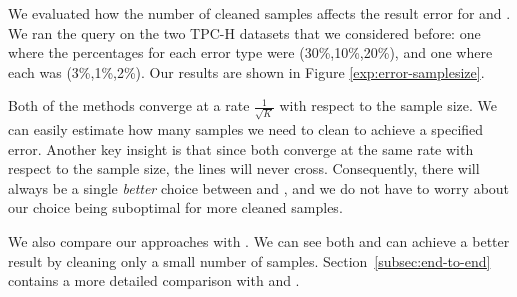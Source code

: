 We evaluated how the number of cleaned samples affects the result error for \sampleclean and \bias.
We ran the \avgfunc query on the two TPC-H datasets that we considered before: one where the percentages for each error type were (30\%,10\%,20\%), and one where each was (3\%,1\%,2\%).
Our results are shown in Figure \ref{exp:error-samplesize}.

Both of the methods converge at a rate $\frac{1}{\sqrt{K}}$ with respect to the sample size.
We can easily estimate how many samples we need to clean to achieve a specified error. %
Another key insight is that since both converge at the same rate with respect to the sample size, the lines will never cross.
Consequently, there will always be a single \emph{better} choice between \sampleclean and \bias, and we do not have to worry about our choice being suboptimal for more cleaned samples.

We also compare our approaches with \alldirty. We can see both \sampleclean and \biascorrected can achieve a better result by cleaning only a small number of samples. Section~\ref{subsec:end-to-end} contains a more detailed comparison with \alldirty and \allclean.




